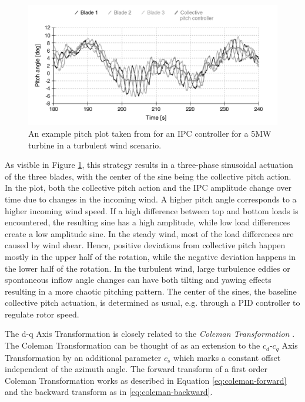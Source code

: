 \begin{figure}
  \includegraphics[width=\textwidth]{images/IPC-reference.png}
  \caption{An example pitch plot taken from \citet[Figure 2]{bossanyiIndividualBladePitch2003} for an IPC controller for a 5MW turbine in a turbulent wind scenario.}
  \label{fig:ipc-reference}
\end{figure}

As visible in Figure \ref{fig:ipc-reference}, this strategy results in a three-phase sinusoidal actuation of the three blades, with the center of the sine being the collective pitch action. In the plot, both the collective pitch action and the IPC amplitude change over time due to changes in the incoming wind. A higher pitch angle corresponds to a higher incoming wind speed. If a high difference between top and bottom loads is encountered, the resulting sine has a high amplitude, while low load differences create a low amplitude sine. In the steady wind, most of the load differences are caused by wind shear. Hence, positive deviations from collective pitch happen mostly in the upper half of the rotation, while the negative deviation happens in the lower half of the rotation. In the turbulent wind, large turbulence eddies or spontaneous inflow angle changes can have both tilting and yawing effects resulting in a more chaotic pitching pattern. The center of the sines, the baseline collective pitch actuation, is determined as usual, e.g. through a \ac{PID} controller to regulate rotor speed.

The d-q Axis Transformation is closely related to the \textit{Coleman Transformation} \cite{birMultibladeCoordinateTransformation2008}. The Coleman Transformation can be thought of as an extension to the $c_d$-$c_q$ Axis Transformation by an additional parameter $c_s$ which marks a constant offset independent of the azimuth angle. The forward transform of a first order Coleman Transformation works as described in Equation \ref{eq:coleman-forward} and the backward transform as in \ref{eq:coleman-backward}. 

